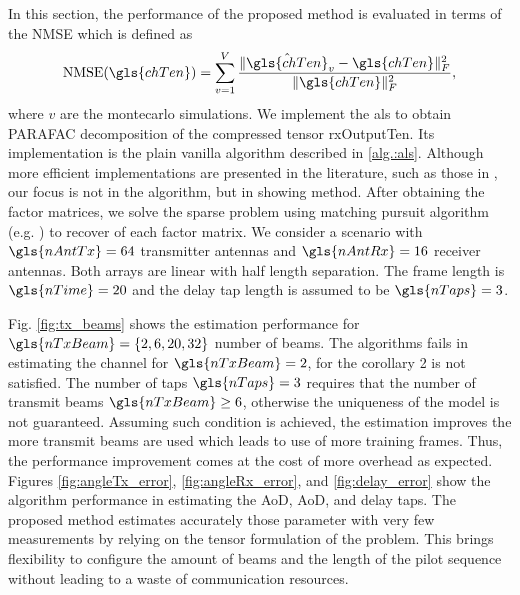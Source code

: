 \documentclass[conference]{IEEEtran}
\begin{document}
In this section, the performance of the proposed method is
evaluated in terms of the \gls{NMSE} which is defined as 
\begin{equation}
  \label{eq:nmse}
  \textrm{NMSE}(\gls{chTen}) = \sum^{V}_{v=1} \frac{\|\hat{\gls{chTen}}_v - \gls{chTen} \|^{2}_F}{\|\gls{chTen} \|^{2}_F},
\end{equation}
where $v$ are the montecarlo simulations. We implement the \gls{als} to obtain
\gls{PARAFAC} decomposition of the compressed tensor \gls{rxOutputTen}. Its
implementation is the plain vanilla algorithm described in
\ref{alg.:als}. Although more efficient implementations are presented in the
literature, such as those in
\cite{Sidiropoulos:2000,Rajih:2005,Bader:2015,Bader:2007}, our focus is not in
the algorithm, but  in showing method. After obtaining the factor matrices, we solve the sparse
problem using  matching pursuit algorithm (e.g. \cite{Tropp:2008}) to recover of
each factor matrix. %
We consider a scenario with  $\gls{nAntTx}=64$ transmitter antennas and
$\gls{nAntRx}=16$ receiver antennas. Both arrays are linear with half length
separation. The frame length is $\gls{nTime} = 20$ and the delay tap length is
assumed to be $\gls{nTaps}=3$. 

Fig. \ref{fig:tx_beams}  shows the estimation performance for  $\gls{nTxBeam} =
\{2,6,20,32\}$ number of beams. The algorithms fails in estimating the channel
for $\gls{nTxBeam}=2$, for the corollary 2 is not satisfied. The number of taps
$\gls{nTaps}=3$ requires that the number of transmit beams $\gls{nTxBeam} \geq 6
$, otherwise the uniqueness of the model is not guaranteed. Assuming such
condition is achieved, the estimation improves the more transmit beams are
used which leads to use of more training frames. Thus, the performance
improvement comes at the cost of more overhead as expected. Figures \ref{fig:angleTx_error}, \ref{fig:angleRx_error}, and
\ref{fig:delay_error} show the algorithm performance in estimating the \gls{AoD},
\gls{AoD}, and delay taps. The proposed method estimates accurately those
parameter with very few measurements by relying on the tensor formulation of the
problem. This brings flexibility to configure the amount of beams and the length
of the pilot sequence without leading to a waste of communication resources.


\end{document}
